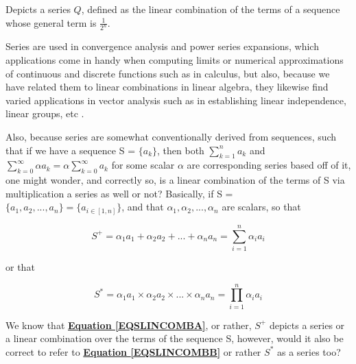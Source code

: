 \documentclass[a4paper, 18pt]{book} %
\begin{document}
\begin{appendices}
\vspace{2em}

Depicts a series $Q$, defined as the linear combination of the terms of a sequence whose general term is $\frac{1}{2^n}$.

\vspace{2em}

Series are used in convergence analysis and power series expansions\cite{knopp1990theory}, which applications come in handy when computing limits or numerical approximations of continuous and discrete functions such as in calculus, but also, because we have related them to linear combinations in linear algebra, they likewise find varied applications in vector analysis such as in establishing linear independence, linear groups, etc \cite{nef1967linear}.

\vspace{2em}

Also, because series are somewhat conventionally derived from sequences\cite{fitzpatrick1995advanced}, such that if we have a sequence S = $\{a_k\}$, then both $\sum\limits_{k=1}^{n} a_k$ and $ \sum\limits_{k=0}^{\infty} \alpha a_k = \alpha \sum\limits_{k=0}^{\infty} a_k$ for some scalar $\alpha$ are corresponding series based off of it, one might wonder, and correctly so, is a linear combination of the terms of S via multiplication a series as well or not? Basically, if S = $\{a_1, a_2, ..., a_n\} = \{a_{i\in [1,n]}\}$, and that $\alpha_1, \alpha_2,... ,\alpha_n$ are scalars, so that

\begin{equation}
\label{EQSLINCOMBA}
S^+ = \alpha_1a_1 + \alpha_2a_2 + ... + \alpha_na_n = \sum\limits_{i=1}^{n} \alpha_i a_i  
\end{equation}

or that

\begin{equation}
\label{EQSLINCOMBB}
S^* = \alpha_1a_1 \times \alpha_2a_2 \times ... \times \alpha_na_n = \prod\limits_{i=1}^{n} \alpha_i a_i  
\end{equation}

\vspace{2em}

We know that  \textbf{\hyperref[EQSLINCOMBA]{Equation \ref{EQSLINCOMBA}}}, or rather, $S^+$ depicts a series or a linear combination over the terms of the sequence S, however, would it also be correct to refer to  \textbf{\hyperref[EQSLINCOMBB]{Equation \ref{EQSLINCOMBB}}} or rather $S^*$ as a series too? 


\end{appendices}
\end{document}

